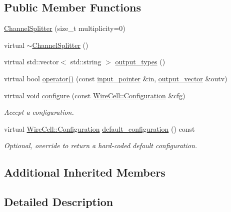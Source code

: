 \subsection*{Public Member Functions}
\begin{DoxyCompactItemize}
\item 
\hyperlink{class_wire_cell_1_1_sig_proc_1_1_channel_splitter_ab4320f32e1ddf7ef8c946519a1ff9338}{Channel\+Splitter} (size\+\_\+t multiplicity=0)
\item 
virtual \hyperlink{class_wire_cell_1_1_sig_proc_1_1_channel_splitter_aabc70e325910c54e7fcc8c3d464289b1}{$\sim$\+Channel\+Splitter} ()
\item 
virtual std\+::vector$<$ std\+::string $>$ \hyperlink{class_wire_cell_1_1_sig_proc_1_1_channel_splitter_aae5dd9627d127e38fd31d88a4b61b584}{output\+\_\+types} ()
\item 
virtual bool \hyperlink{class_wire_cell_1_1_sig_proc_1_1_channel_splitter_a715114dbeb142744c3a140a902907ff0}{operator()} (const \hyperlink{class_wire_cell_1_1_i_fanout_node_aefd36d56a531edf1990fe6e263d9c266}{input\+\_\+pointer} \&in, \hyperlink{class_wire_cell_1_1_i_fanout_node_a650cda83709781daac2d67af7c3706df}{output\+\_\+vector} \&outv)
\item 
virtual void \hyperlink{class_wire_cell_1_1_sig_proc_1_1_channel_splitter_a843b48ddc563591f31a8c51f3d46dbe5}{configure} (const \hyperlink{namespace_wire_cell_a9f705541fc1d46c608b3d32c182333ee}{Wire\+Cell\+::\+Configuration} \&cfg)
\begin{DoxyCompactList}\small\item\em Accept a configuration. \end{DoxyCompactList}\item 
virtual \hyperlink{namespace_wire_cell_a9f705541fc1d46c608b3d32c182333ee}{Wire\+Cell\+::\+Configuration} \hyperlink{class_wire_cell_1_1_sig_proc_1_1_channel_splitter_a3e7deb7d0ebe470ff7748f015eee0f9c}{default\+\_\+configuration} () const
\begin{DoxyCompactList}\small\item\em Optional, override to return a hard-\/coded default configuration. \end{DoxyCompactList}\end{DoxyCompactItemize}
\subsection*{Additional Inherited Members}


\subsection{Detailed Description}


